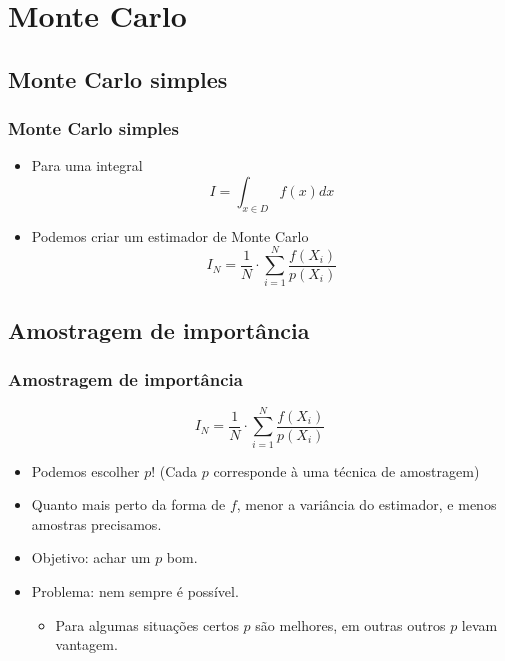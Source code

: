 \documentclass{beamer}
\begin{document}

\section{Monte Carlo}


\subsection{Monte Carlo simples}

\begin{frame}
\frametitle{Monte Carlo simples}

\begin{itemize}
  \item<1-> Para uma integral
  \[
    I = \int_{x \in D} f(x) dx
  \]
  \item<2-> Podemos criar um estimador de Monte Carlo
  \[
    I_N = \frac{1}{N} \cdot \sum_{i=1}^N \frac{f(X_i)}{p(X_i)}
  \]
\end{itemize}

\end{frame}


\subsection{Amostragem de importância}

\begin{frame}
\frametitle{Amostragem de importância}
  \[
    I_N = \frac{1}{N} \cdot \sum_{i=1}^N \frac{f(X_i)}{p(X_i)}
  \]

\begin{itemize}
  \item<2-> Podemos escolher $p$! (Cada $p$ corresponde à uma técnica de amostragem)
  \item<3-> Quanto mais perto da forma de $f$, menor a variância do estimador,
  e menos amostras precisamos.
  \item<4-> Objetivo: achar um $p$ bom.
  \item<5-> Problema: nem sempre é possível.
    \begin{itemize}
      \item<6-> Para algumas situações certos $p$ são melhores, em outras
        outros $p$ levam vantagem.
    \end{itemize}
\end{itemize}

\end{frame}
\end{document}
